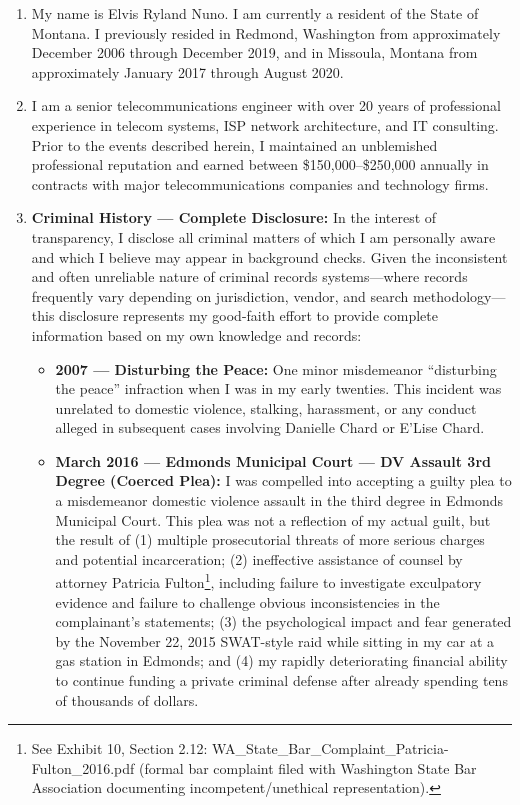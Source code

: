 \documentclass[12pt,letterpaper]{article}
\begin{document}
\begin{enumerate}

\item My name is Elvis Ryland Nuno. I am currently a resident of the State of Montana. I previously resided in Redmond, Washington from approximately December 2006 through December 2019, and in Missoula, Montana from approximately January 2017 through August 2020.

\item I am a senior telecommunications engineer with over 20 years of professional experience in telecom systems, ISP network architecture, and IT consulting. Prior to the events described herein, I maintained an unblemished professional reputation and earned between \$150,000--\$250,000 annually in contracts with major telecommunications companies and technology firms.

\item \textbf{Criminal History --- Complete Disclosure:} In the interest of transparency, I disclose all criminal matters of which I am personally aware and which I believe may appear in background checks. Given the inconsistent and often unreliable nature of criminal records systems—where records frequently vary depending on jurisdiction, vendor, and search methodology—this disclosure represents my good-faith effort to provide complete information based on my own knowledge and records:

\begin{itemize}
  \item \textbf{2007 --- Disturbing the Peace:} One minor misdemeanor ``disturbing the peace'' infraction when I was in my early twenties. This incident was unrelated to domestic violence, stalking, harassment, or any conduct alleged in subsequent cases involving Danielle Chard or E'Lise Chard.

  \item \textbf{March 2016 --- Edmonds Municipal Court --- DV Assault 3rd Degree (Coerced Plea):} I was compelled into accepting a guilty plea to a misdemeanor domestic violence assault in the third degree in Edmonds Municipal Court. This plea was not a reflection of my actual guilt, but the result of (1) multiple prosecutorial threats of more serious charges and potential incarceration; (2) ineffective assistance of counsel by attorney Patricia Fulton\footnote{See Exhibit 10, Section 2.12: WA\_State\_Bar\_Complaint\_Patricia-Fulton\_2016.pdf (formal bar complaint filed with Washington State Bar Association documenting incompetent/unethical representation).}, including failure to investigate exculpatory evidence and failure to challenge obvious inconsistencies in the complainant's statements; (3) the psychological impact and fear generated by the November 22, 2015 SWAT-style raid while sitting in my car at a gas station in Edmonds; and (4) my rapidly deteriorating financial ability to continue funding a private criminal defense after already spending tens of thousands of dollars.


\end{itemize}
\end{enumerate}
\end{document}
